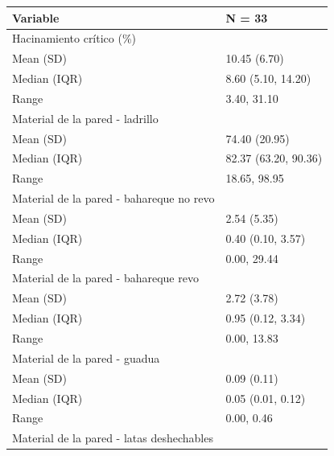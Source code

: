 \begin{table}
\centering\begingroup\fontsize{7}{9}\selectfont

\begin{tabular}{ll}
\toprule
Variable & N = 33\\
\midrule
Hacinamiento crítico (\%) & \\
\hspace{1em}Mean (SD) & 10.45 (6.70)\\
\hspace{1em}Median (IQR) & 8.60 (5.10, 14.20)\\
\hspace{1em}Range & 3.40, 31.10\\
Material de la pared - ladrillo & \\
\addlinespace
\hspace{1em}Mean (SD) & 74.40 (20.95)\\
\hspace{1em}Median (IQR) & 82.37 (63.20, 90.36)\\
\hspace{1em}Range & 18.65, 98.95\\
Material de la pared - bahareque no revo & \\
\hspace{1em}Mean (SD) & 2.54 (5.35)\\
\addlinespace
\hspace{1em}Median (IQR) & 0.40 (0.10, 3.57)\\
\hspace{1em}Range & 0.00, 29.44\\
Material de la pared - bahareque revo & \\
\hspace{1em}Mean (SD) & 2.72 (3.78)\\
\hspace{1em}Median (IQR) & 0.95 (0.12, 3.34)\\
\addlinespace
\hspace{1em}Range & 0.00, 13.83\\
Material de la pared - guadua & \\
\hspace{1em}Mean (SD) & 0.09 (0.11)\\
\hspace{1em}Median (IQR) & 0.05 (0.01, 0.12)\\
\hspace{1em}Range & 0.00, 0.46\\
\addlinespace
Material de la pared - latas deshechables & \\

\end{tabular}
\end{table}
